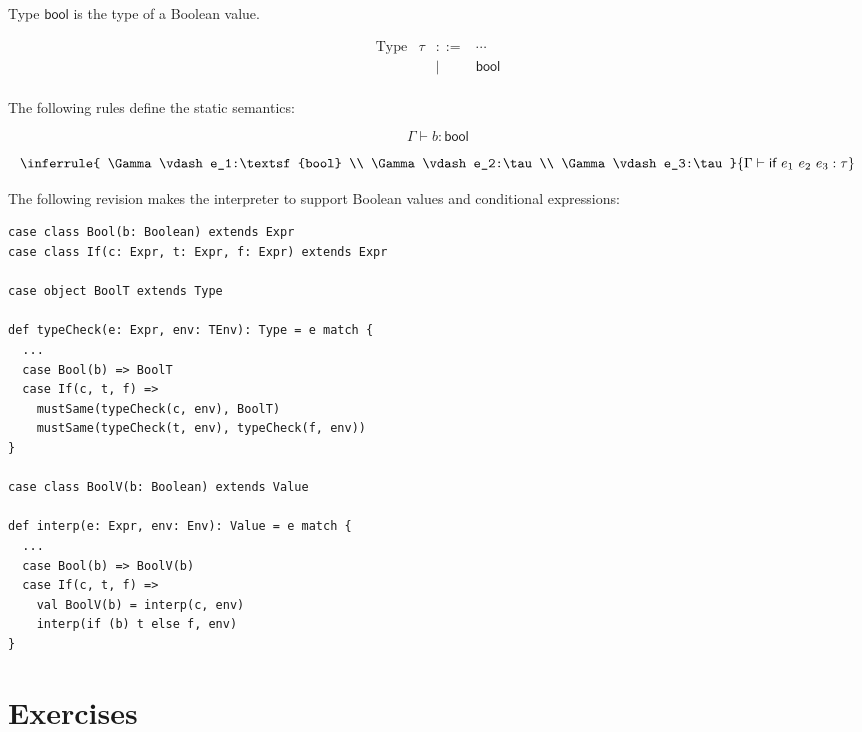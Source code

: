 Type $\textsf{bool}$ is the type of a Boolean value.

\[
\begin{array}{lrcl}
\text{Type} & \tau & ::= & \cdots \\
&& | & \textsf{bool} \\
\end{array}
\]

The following rules define the static semantics:

\[
{ \Gamma\vdash b:\textsf{bool} }
\]

\[
\inferrule
{
  \Gamma\vdash e_1:\textsf{bool} \\
  \Gamma\vdash e_2:\tau \\
  \Gamma\vdash e_3:\tau
}
{ \Gamma\vdash \textsf{if}\ e_1\ e_2\ e_3:\tau }
\]

The following revision makes the interpreter to support Boolean values and
conditional expressions:

\begin{verbatim}
case class Bool(b: Boolean) extends Expr
case class If(c: Expr, t: Expr, f: Expr) extends Expr

case object BoolT extends Type

def typeCheck(e: Expr, env: TEnv): Type = e match {
  ...
  case Bool(b) => BoolT
  case If(c, t, f) =>
    mustSame(typeCheck(c, env), BoolT)
    mustSame(typeCheck(t, env), typeCheck(f, env))
}

case class BoolV(b: Boolean) extends Value

def interp(e: Expr, env: Env): Value = e match {
  ...
  case Bool(b) => BoolV(b)
  case If(c, t, f) =>
    val BoolV(b) = interp(c, env)
    interp(if (b) t else f, env)
}
\end{verbatim}

\section{Exercises}


